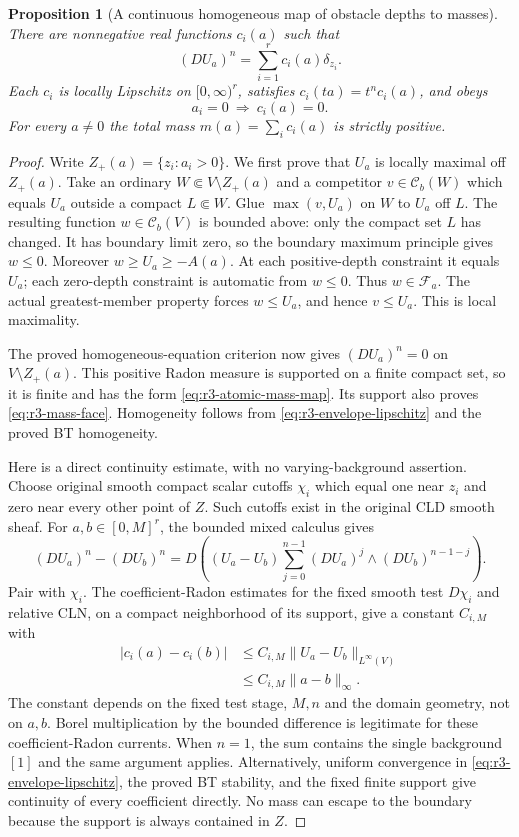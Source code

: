 \documentclass[11pt,a4paper]{article}
\numberwithin{equation}{section}
\newtheorem{proposition}[theorem]{Proposition}
\theoremstyle{definition}
\theoremstyle{remark}
\newcommand{\Cb}{\mathcal C_b}
\begin{document}
\begin{proposition}[A continuous homogeneous map of obstacle depths to masses]
\label{prop:r3-atomic-mass-map}
There are nonnegative real functions $c_i(a)$ such that
\[
 (DU_a)^n=\sum_{i=1}^r c_i(a)\delta_{z_i}.
 \tag{2}\label{eq:r3-atomic-mass-map}
\]
Each $c_i$ is locally Lipschitz on $[0,\infty)^r$, satisfies
$c_i(ta)=t^n c_i(a)$, and obeys
\[
 a_i=0\ \Longrightarrow\ c_i(a)=0.
 \tag{3}\label{eq:r3-mass-face}
\]
For every $a\ne0$ the total mass
$m(a)=\sum_i c_i(a)$ is strictly positive.
\end{proposition}

\begin{proof}
Write $Z_+(a)=\{z_i:a_i>0\}$. We first prove that $U_a$
is locally maximal off $Z_+(a)$. Take an ordinary
$W\Subset V\setminus Z_+(a)$ and a competitor
$v\in\Cb(W)$ which equals $U_a$ outside a compact
$L\Subset W$. Glue $\max(v,U_a)$ on $W$ to $U_a$ off
$L$. The resulting function $w\in\Cb(V)$ is bounded above:
only the compact set $L$ has changed. It has boundary limit
zero, so the boundary maximum principle gives $w\leq0$.
Moreover $w\geq U_a\geq-A(a)$. At each positive-depth
constraint it equals $U_a$; each zero-depth constraint is
automatic from $w\leq0$. Thus $w\in\mathcal F_a$.
The actual greatest-member property forces $w\leq U_a$,
and hence $v\leq U_a$. This is local maximality.

The proved homogeneous-equation criterion now gives
$(DU_a)^n=0$ on $V\setminus Z_+(a)$. This positive Radon
measure is supported on a finite compact set, so it is finite
and has the form \eqref{eq:r3-atomic-mass-map}. Its support
also proves \eqref{eq:r3-mass-face}. Homogeneity follows from
\eqref{eq:r3-envelope-lipschitz} and the proved BT homogeneity.

Here is a direct continuity estimate, with no varying-background
assertion. Choose original smooth compact scalar cutoffs
$\chi_i$ which equal one near $z_i$ and zero near every other
point of $Z$. Such cutoffs exist in the original CLD smooth
sheaf. For $a,b\in[0,M]^r$, the bounded mixed calculus gives
\[
 (DU_a)^n-(DU_b)^n
   =D\left((U_a-U_b)
          \sum_{j=0}^{n-1}(DU_a)^j\wedge(DU_b)^{n-1-j}\right).
\]
Pair with $\chi_i$. The coefficient-Radon estimates for the
fixed smooth test $D\chi_i$ and relative CLN, on a compact
neighborhood of its support, give a constant $C_{i,M}$ with
\[
 \begin{split}
 |c_i(a)-c_i(b)|
 &\leq C_{i,M}\|U_a-U_b\|_{L^\infty(V)}\\
 &\leq C_{i,M}\|a-b\|_\infty.
 \end{split}
\]
The constant depends on the fixed test stage, $M,n$ and the
domain geometry, not on $a,b$. Borel multiplication by the
bounded difference is legitimate for these coefficient-Radon
currents. When $n=1$, the sum contains the single background
$[1]$ and the same argument applies. Alternatively, uniform
convergence in \eqref{eq:r3-envelope-lipschitz}, the proved
BT stability, and the fixed finite support give continuity
of every coefficient directly. No mass can escape to the
boundary because the support is always contained in $Z$.


\end{proof}
\end{document}
